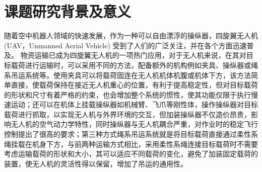 \documentclass[lang=chs, degree=master, blindreview=true, winfonts=true]{yanputhesis}
\begin{document}
\section{课题研究背景及意义}
随着空中机器人领域的快速发展，作为一种可以自由漂浮的操纵器，四旋翼无人机(UAV，Unmanned Aerial Vehicle) 受到了人们的广泛关注，并在各个方面迅速普及\cite{kimon_advances_2023}。
物资运输已成为四旋翼无人机的一项热门应用\cite{cruz2014autonomous}，对于无人机来说，在其对目标载荷进行运输时，可以采用不同的方法，配备额外的机构例如夹具、操纵器或绳系吊运系统等。使用夹具可以将载荷固连在无人机机体机腹或机体下方，该方法简单直接，使载荷保持在接近无人机重心的位置，有利于提高稳定性，但对目标载荷的形状和尺寸有着严格的约束，也会增加整个系统的惯性，使其功能仅限于执行慢速运动\cite{Khalifa2017}；还可以在机体上挂载操纵器如机械臂、飞爪等刚性体，操作操纵器对目标载荷进行抓取，以实现无人机与外界环境的交互，但加装操纵器不仅造价昂贵，影响无人机的空气动力学特性，同时操纵器与无人机耦合严重，对作业时的稳定飞行控制提出了很高的要求；第三种方式绳系吊运系统就是将目标载荷直接通过柔性系绳挂载在机身下方，与前两种运输方式相比，采用柔性系绳连接目标载荷时不需要考虑运输载荷的形状和大小，其可以适应不同载荷的变化，避免了加装固定载荷的装置，使无人机的灵活性得以保留，增加了吊运的通用性。
\end{document}
